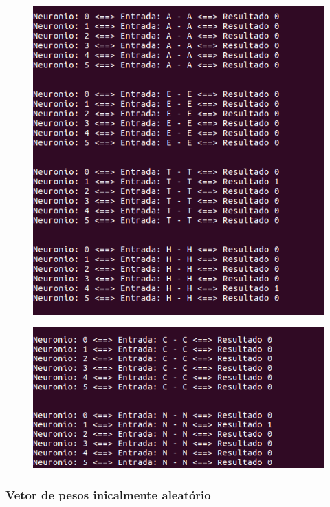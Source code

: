 \documentclass[hidelinks,12pt]{article}
\begin{document}
		\begin{figure}[!h]
			\centering
			\includegraphics[scale=0.5]{Figures/E3SLP1.png}
		\end{figure}
		
		\begin{figure}[!h]
			\centering
			\includegraphics[scale=0.5]{Figures/E3SLP2.png}
		\end{figure}
		
		\newpage
		
		\subsubsection{Vetor de pesos inicalmente aleatório}
		
\end{document}
